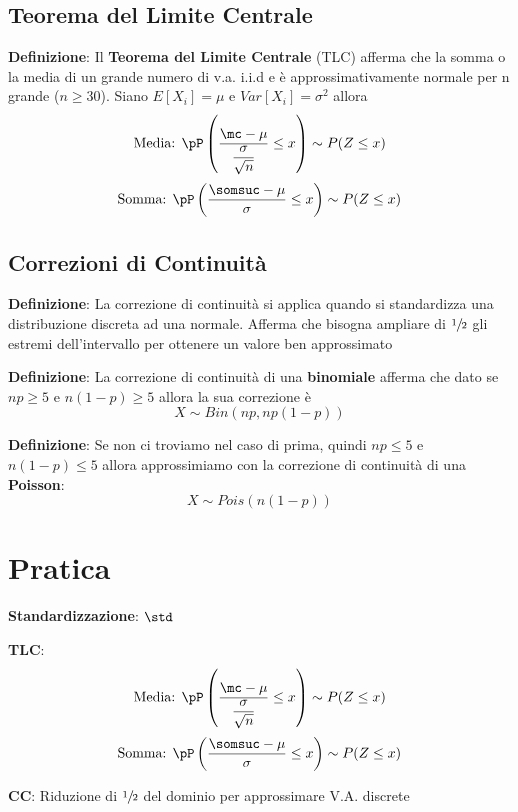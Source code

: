 \newpage
\subsection{Teorema del Limite Centrale}

\ind \textbf{Definizione}: Il \textbf{Teorema del Limite Centrale} (TLC) afferma che la somma o la media di un grande numero di v.a. i.i.d e è approssimativamente normale per n grande ($n \geq 30$). Siano $E[X_i]=\mu$ e $Var[X_i]=\sigma^2$ allora $$ \text{Media: } \pP \left( \dfrac{\mc - \mu}{ \dfrac{\sigma}{\sqrt{n}}} \leq x \right) \sim P(Z \leq x)$$ $$ \text{Somma: } \pP \left( \dfrac{\somsuc - \mu}{ \sigma} \leq x \right) \sim P(Z \leq x)$$

\subsection{Correzioni di Continuità}

\ind \textbf{Definizione}: La correzione di continuità si applica quando si standardizza una distribuzione discreta ad una normale. Afferma che bisogna ampliare di $\sfrac{1}{2}$ gli estremi dell'intervallo per ottenere un valore ben approssimato \n

\ind \textbf{Definizione}: La correzione di continuità di una \textbf{binomiale} afferma che dato se $np \geq 5$ e $n(1 - p) \geq 5$ allora la sua correzione è $$X \sim Bin (np, np(1 - p))$$ 

\ind \textbf{Definizione}: Se non ci troviamo nel caso di prima, quindi $np \leq 5$ e $n(1 - p) \leq 5$ allora approssimiamo con la correzione di continuità di una \textbf{Poisson}: $$X \sim Pois(n(1 - p))$$


\newpage
\section{Pratica}

\ind \textbf{Standardizzazione}: $\std$ \n

\ind \textbf{TLC}: $$ \text{Media: } \pP \left( \dfrac{\mc - \mu}{ \dfrac{\sigma}{\sqrt{n}}} \leq x \right) \sim P(Z \leq x)$$ $$ \text{Somma: } \pP \left( \dfrac{\somsuc - \mu}{ \sigma} \leq x \right) \sim P(Z \leq x)$$

\ind \textbf{CC}: Riduzione di $\sfrac{1}{2}$ del dominio per approssimare V.A. discrete \n

